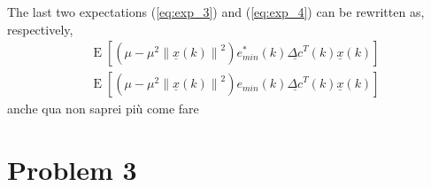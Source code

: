 \documentclass{article}
\renewcommand{\vec}[1]{\underline{#1}}
\newcommand{\E}[1]{\operatorname{E}\left[#1\right]}
\newcommand{\norm}[1]{\left\lVert#1\right\rVert}
\begin{document}
The last two expectations (\ref{eq:exp_3}) and (\ref{eq:exp_4}) can be
rewritten as, respectively,
\begin{align*}
  & \E{\left(\mu - \mu^2\norm{\vec{x}(k)}^2\right) e_{min}^*(k) \vec{\Delta c}^T(k)\vec{x}(k)} \\
  & \E{\left(\mu - \mu^2\norm{\vec{x}(k)}^2\right) e_{min}(k) \vec{\Delta c}^T(k)\vec{x}(k)}
\end{align*}
{\color{red} anche qua non saprei più come fare}
\section*{Problem 3}
\end{document}
